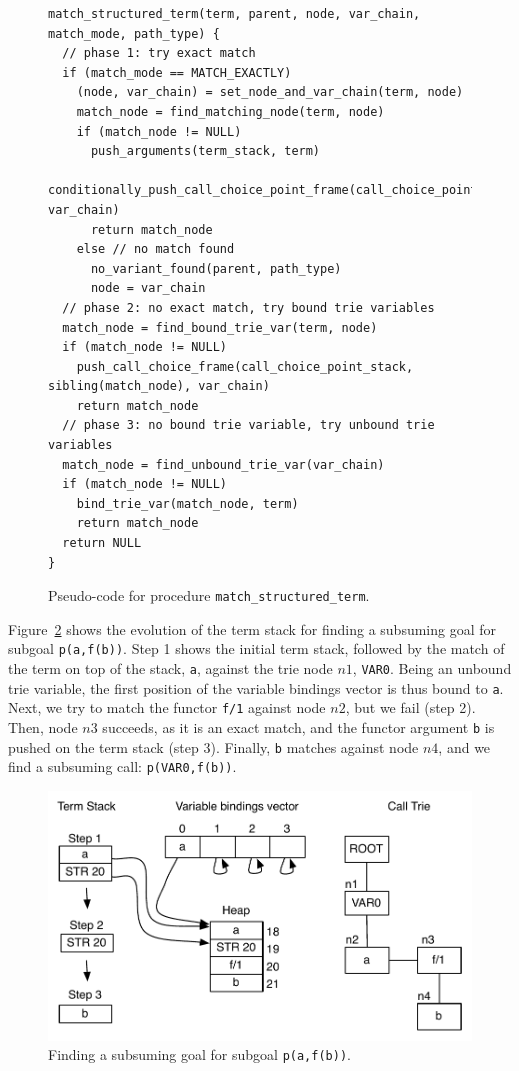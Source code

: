 \begin{figure}[ht]
\begin{Verbatim}
match_structured_term(term, parent, node, var_chain, match_mode, path_type) {
  // phase 1: try exact match
  if (match_mode == MATCH_EXACTLY)
    (node, var_chain) = set_node_and_var_chain(term, node)
    match_node = find_matching_node(term, node)
    if (match_node != NULL)
      push_arguments(term_stack, term)
      conditionally_push_call_choice_point_frame(call_choice_point_stack, var_chain)
      return match_node
    else // no match found
      no_variant_found(parent, path_type)
      node = var_chain
  // phase 2: no exact match, try bound trie variables
  match_node = find_bound_trie_var(term, node)
  if (match_node != NULL)
    push_call_choice_frame(call_choice_point_stack, sibling(match_node), var_chain)
    return match_node
  // phase 3: no bound trie variable, try unbound trie variables
  match_node = find_unbound_trie_var(var_chain)
  if (match_node != NULL)
    bind_trie_var(match_node, term)
    return match_node
  return NULL
}
\end{Verbatim}
\caption{Pseudo-code for procedure \texttt{match\_structured\_term}.}
\label{fig:match_structured_term}
\end{figure}

Figure~\ref{fig:match_functor} shows the evolution of the term stack for finding
a subsuming goal for subgoal \texttt{p(a,f(b))}. Step 1 shows the initial
term stack, followed by the match of the term on top of the stack, \texttt{a},
against the trie node $n1$, \texttt{VAR0}.
Being an unbound trie variable, the first position of the variable bindings
vector is thus bound to \texttt{a}.
Next, we try to match the functor \texttt{f/1} against node $n2$, but we fail (step 2).
Then, node $n3$ succeeds, as it is an exact match, and the functor argument \texttt{b} is pushed on
the term stack (step 3). Finally, \texttt{b} matches against node $n4$, and we find
a subsuming call: \texttt{p(VAR0,f(b))}.

\begin{figure}[ht]
  \centering
    \includegraphics[scale=0.6]{match_functor.pdf}
  \caption{Finding a subsuming goal for subgoal \texttt{p(a,f(b))}.}
  \label{fig:match_functor}
\end{figure}

